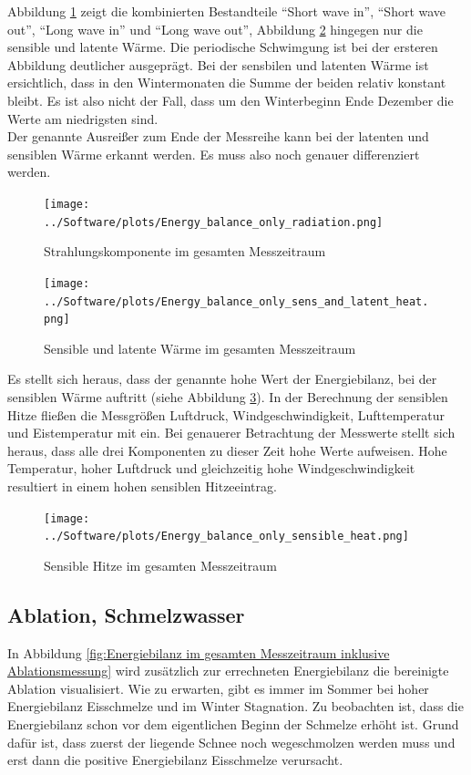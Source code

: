 \documentclass[12pt,a4paper]{article}
\begin{document}
Abbildung \ref{fig:Strahlungskomponente im gesamten Messzeitraum} zeigt die kombinierten Bestandteile ``Short wave in'', ``Short wave out'', ``Long wave in'' und ``Long wave out'', Abbildung \ref{fig:Sensible und latente Wärme im gesamten Messzeitraum} hingegen nur die sensible und latente Wärme. Die periodische Schwimgung ist bei der ersteren Abbildung deutlicher ausgeprägt. Bei der sensbilen und latenten Wärme ist ersichtlich, dass in den Wintermonaten die Summe der beiden relativ konstant bleibt. Es ist also nicht der Fall, dass um den Winterbeginn Ende Dezember die Werte am niedrigsten sind.\\
Der genannte Ausreißer zum Ende der Messreihe kann bei der latenten und sensiblen Wärme erkannt werden. Es muss also noch genauer differenziert werden.

\begin{figure}[H]
\centering
\texttt{[image: ../Software/plots/Energy\_balance\_only\_radiation.png]}
\caption{Strahlungskomponente im gesamten Messzeitraum}
\label{fig:Strahlungskomponente im gesamten Messzeitraum}
\end{figure}

\begin{figure}[H]
\centering
\texttt{[image: ../Software/plots/Energy\_balance\_only\_sens\_and\_latent\_heat.png]}
\caption{Sensible und latente Wärme im gesamten Messzeitraum}
\label{fig:Sensible und latente Wärme im gesamten Messzeitraum}
\end{figure}

Es stellt sich heraus, dass der genannte hohe Wert der Energiebilanz, bei der sensiblen Wärme auftritt (siehe Abbildung \ref{fig:Sensible Hitze im gesamten Messzeitraum}). In der Berechnung der sensiblen Hitze fließen die Messgrößen Luftdruck, Windgeschwindigkeit, Lufttemperatur und Eistemperatur mit ein. Bei genauerer Betrachtung der Messwerte stellt sich heraus, dass alle drei Komponenten zu dieser Zeit hohe Werte aufweisen. Hohe Temperatur, hoher Luftdruck und gleichzeitig hohe Windgeschwindigkeit resultiert in einem hohen sensiblen Hitzeeintrag. 


\begin{figure}[H]
\centering
\texttt{[image: ../Software/plots/Energy\_balance\_only\_sensible\_heat.png]}
\caption{Sensible Hitze im gesamten Messzeitraum}
\label{fig:Sensible Hitze im gesamten Messzeitraum}
\end{figure}


\subsection{Ablation, Schmelzwasser}
In Abbildung \ref{fig:Energiebilanz im gesamten Messzeitraum inklusive Ablationsmessung} wird zusätzlich zur errechneten Energiebilanz die bereinigte Ablation visualisiert. Wie zu erwarten, gibt es immer im Sommer bei hoher Energiebilanz Eisschmelze und im Winter Stagnation. Zu beobachten ist, dass die Energiebilanz schon vor dem eigentlichen Beginn der Schmelze erhöht ist. Grund dafür ist, dass zuerst der liegende Schnee noch wegeschmolzen werden muss und erst dann die positive Energiebilanz Eisschmelze verursacht.
\end{document}

